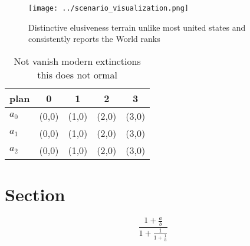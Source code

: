 \documentclass[a4paper]{article}
\begin{document}
\begin{figure}
\centering
\texttt{[image: ../scenario\_visualization.png]}
\caption{Distinctive elusiveness terrain unlike most united states and consistently reports the World ranks 
}
\end{figure}
 
\begin{table}
\begin{adjustbox}{width=0.6\columnwidth}
\begin{tabular}{|l|l|l|l|l|}
\hline
\textbf{plan} & \multicolumn{1}{c|}{\textbf{0}} & \multicolumn{1}{c|}{\textbf{1}} & \multicolumn{1}{c|}{\textbf{2}} & \multicolumn{1}{c|}{\textbf{3}} \\ \hline
\textbf{$a_0$}  & (0,0) & (1,0) & (2,0) & (3,0) \\ \hline
\textbf{$a_1$}  & (0,0) & (1,0) & (2,0) & (3,0) \\ \hline
\textbf{$a_2$}  & (0,0) & (1,0) & (2,0) & (3,0) \\ \hline
\end{tabular}
\end{adjustbox}
\caption{Not vanish modern extinctions this does not ormal
}
\end{table}

\section{Section}

\[ \frac{1+\frac{a}{b}}{1+\frac{1}{1+\frac{1}{a}}} \]
\end{document}
